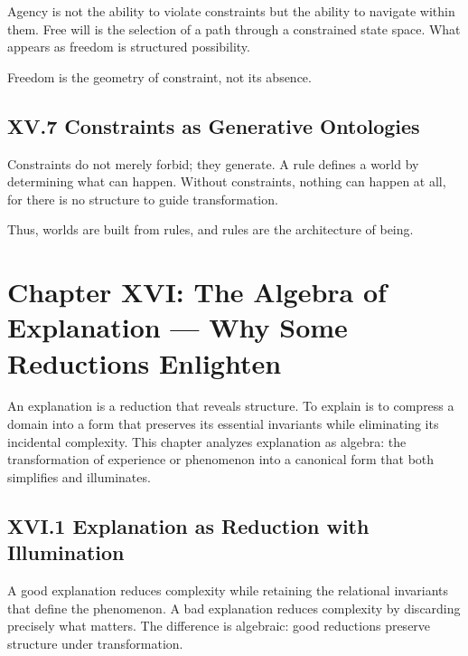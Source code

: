 \documentclass[11pt,letterpaper]{article}
\begin{document}
Agency is not the ability to violate constraints but the ability to navigate within them. Free will is the selection of a path through a constrained state space. What appears as freedom is structured possibility.

Freedom is the geometry of constraint, not its absence.

\subsection{XV.7 Constraints as Generative Ontologies}

Constraints do not merely forbid; they generate. A rule defines a world by determining what can happen. Without constraints, nothing can happen at all, for there is no structure to guide transformation.

Thus, worlds are built from rules, and rules are the architecture of being.

\newpage

\section{Chapter XVI: The Algebra of Explanation — Why Some Reductions Enlighten}

An explanation is a reduction that reveals structure. To explain is to compress a domain into a form that preserves its essential invariants while eliminating its incidental complexity. This chapter analyzes explanation as algebra: the transformation of experience or phenomenon into a canonical form that both simplifies and illuminates.

\subsection{XVI.1 Explanation as Reduction with Illumination}

A good explanation reduces complexity while retaining the relational invariants that define the phenomenon. A bad explanation reduces complexity by discarding precisely what matters. The difference is algebraic: good reductions preserve structure under transformation.
\end{document}
